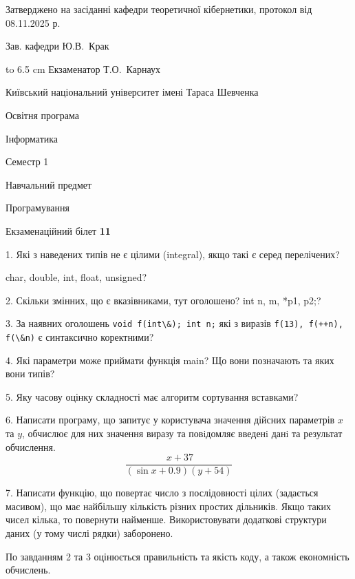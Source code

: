 \documentclass[12pt, ukrainian]{article}
\def\code#1{\Verb!#1!}
\begin{document}
{\smallskip\smallskip \begin {scriptsize} Затверджено на засіданні кафедри теоретичної кібернетики, протокол   від   08.11.2025 р.\par\smallskip\smallskip\smallskip\smallskip
{\parbox {6.5 cm} {Зав. кафедри \dotfill Ю.В.~Крак}}\hspace {0.7cm} {\hbox to 6.5 cm { Екзаменатор \dotfill Т.О.~Карнаух}} \end{scriptsize}}
\newpage
{{\begin {scriptsize}\par
{ \center  Київський національний університет імені Тараса Шевченка \par}
{\parbox {5 cm}{Освітня програма \hfill}{\parbox {7 cm}{Інформатика\hfill}}\parbox {6 cm}{\hfill Семестр 1}}\par
{\parbox {5 cm} {Навчальний предмет \hfill}\parbox {7 cm}{Програмування \hfill}\parbox {6cm}{\hfill}\par}\vspace{-15pt} \end{scriptsize}}{\center Екзаменаційний білет \No \textbf { 11 }\par}}
{%
1. Які з наведених типів не є цілими (integral), якщо такі є серед перелічених?

char, double, int, float, unsigned?
\par
\vspace{2mm}
2. Скільки змінних, що є вказівниками, тут оголошено?
int n, m, *p1, p2;?
\par
\vspace{2mm}
3. За наявних оголошень \code{void f(int\&); int n;} які з виразів \code{f(13), f(++n), f(\&n)} є синтаксично коректними?
\par
\vspace{2mm}
4. Які параметри може приймати функція main? Що вони позначають та яких вони типів?
\par
\vspace{2mm}
5. Яку часову оцінку складності має алгоритм сортування вставками?
\par
\vspace{2mm}
6. Написати програму, що запитує у користувача значення дійсних параметрів $x$ та $y$, обчислює для них значення виразу та повiдомляє введенi данi та результат обчислення.
$$\frac{\ x + 37}{(\sin x + 0.9) (y + 54)}$$ 

\par
7. Написати функцію, що повертає число з послідовності цілих (задається масивом), що має найбільшу кількість різних простих дільників. Якщо таких чисел кілька, то повернути найменше. Використовувати додаткові структури даних (у тому числі рядки) заборонено.

По завданням 2 та 3 оцінюється правильність та якість коду, а також економність обчислень.

}
\end{document}
